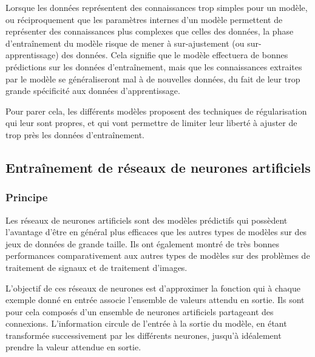 \par Lorsque les données représentent des connaissances trop simples pour un modèle, ou réciproquement que les paramètres internes d'un modèle permettent de représenter des connaissances plus complexes que celles des données, la phase d'entraînement du modèle risque de mener à sur-ajustement (ou sur-apprentissage) des données. Cela signifie que le modèle effectuera de bonnes prédictions sur les données d'entraînement, mais que les connaissances extraites par le modèle se généraliseront mal à de nouvelles données, du fait de leur trop grande spécificité aux données d'apprentissage.\\
\par Pour parer cela, les différents modèles proposent des techniques de régularisation qui leur sont propres, et qui vont permettre de limiter leur liberté à ajuster de trop près les données d'entraînement.


\subsection{Entraînement de réseaux de neurones artificiels}

\label{apprentissage_automatique_nn}

\subsubsection{Principe}
\par Les réseaux de neurones artificiels sont des modèles prédictifs qui possèdent l'avantage d'être en général plus efficaces que les autres types de modèles sur des jeux de données de grande taille. Ils ont également montré de très bonnes performances comparativement aux autres types de modèles sur des problèmes de traitement de signaux et de traitement d'images.\\

\par L'objectif de ces réseaux de neurones est d'approximer la fonction qui à chaque exemple donné en entrée associe l'ensemble de valeurs attendu en sortie. Ils sont pour cela composés d'un ensemble de neurones artificiels partageant des connexions. L'information circule de l'entrée à la sortie du modèle, en étant transformée successivement par les différents neurones, jusqu'à idéalement prendre la valeur attendue en sortie.\\

